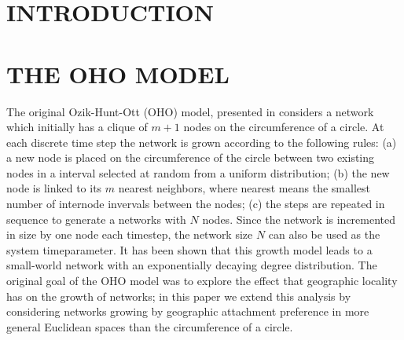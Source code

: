 \documentclass[aps,pre,reprint,superscriptaddress,amsmath,amssymb]{revtex4-1}
\begin{document}
\section{INTRODUCTION}

\section{THE OHO MODEL}
The original Ozik-Hunt-Ott (OHO) model, presented in \cite{ozik2004} considers a network which initially has a clique of $m+1$ nodes on the circumference of a circle. 
At each discrete time step the network is grown according to the following rules: 
(a) a new node is placed on the circumference of the circle between two existing nodes in a interval selected at random from a uniform distribution;
(b) the new node is linked to its $m$ nearest neighbors, where nearest means the smallest number of internode invervals between the nodes;
(c) the steps are repeated in sequence to generate a networks with $N$ nodes.
Since the network is incremented in size by one node each timestep, the network size $N$ can also be used as the system timeparameter.  
It has been shown \cite{ozik2004} that this growth model leads to a small-world network with an exponentially decaying degree distribution. 
The original goal of the OHO model was to explore the effect that geographic locality has on the growth of networks; in this paper we extend this analysis by considering networks growing by geographic attachment preference in more general Euclidean spaces than the circumference of a circle. 
\end{document}
